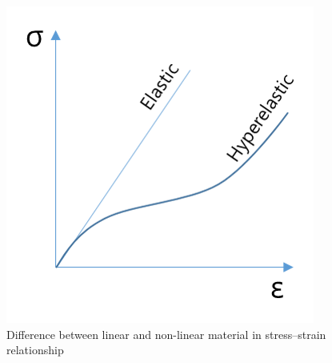 \begin{figure}[H]
    \centering
    \includegraphics[scale=1]{Figures/Hyperelastic.png}
    \decoRule   
    \caption{ Difference between linear and non-linear material in stress–strain relationship}
    \label{fig:Electron}
\end{figure}
